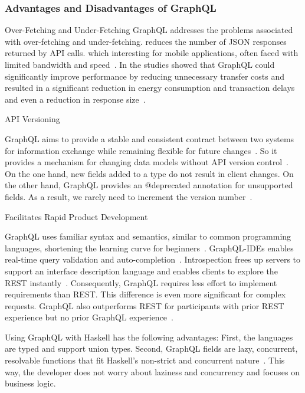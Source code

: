 \begin{frame}\frametitle{Advantages and Disadvantages of GraphQL}


\begin{block}{Over-Fetching and Under-Fetching}
GraphQL addresses the problems associated with over-fetching and under-fetching. 
reduces the number of JSON responses returned by API calls. which interesting for mobile applications, often faced with limited bandwidth and speed~\cite{migrating-to-gql,gql-healthcare}. In the studies showed that GraphQL could significantly improve performance by reducing unnecessary transfer costs and resulted in a significant reduction in energy consumption and transaction delays and even a reduction in response size~\cite{migrating-to-gql,real-time-sys-arc-based-on-gql,gql-iot}.
\end{block}

\begin{block}{API Versioning}

GraphQL aims to provide a stable and consistent contract between two systems for information exchange while remaining flexible for future changes~\cite{gql-healthcare}. 
So it provides a mechanism for changing data models without API version control~\cite{real-time-sys-arc-based-on-gql}. On the one hand, new fields added to a type do not result in client changes. On the other hand, GraphQL provides an @deprecated annotation for unsupported fields. As a result, we rarely need to increment the version number~\cite{migrating-to-gql}.

\end{block}

\begin{block}{Facilitates Rapid Product Development}

GraphQL uses familiar syntax and semantics, similar to common programming languages, shortening the learning curve for beginners~\cite{rest-vs-gql-controlled-experiment}.
GraphQL-IDEs enables real-time query validation and auto-completion~\cite{rest-vs-gql-controlled-experiment,migrating-to-gql}.
Introspection frees up servers to support an interface description language and enables clients to explore the REST instantly~\cite{migrating-to-gql}. Consequently, GraphQL requires less effort to implement requirements than REST. This difference is even more significant for complex requests. GraphQL also outperforms REST for participants with prior REST experience but no prior GraphQL experience~\cite{rest-vs-gql-controlled-experiment}.

\end{block}

Using GraphQL with Haskell has the following advantages: First, the languages are typed and support union types. Second, GraphQL fields are lazy, concurrent, resolvable functions that fit Haskell's non-strict and concurrent nature~\cite{gql-spec,haskell-homepage}. This way, the developer does not worry about laziness and concurrency and focuses on business logic.


\end{frame}

